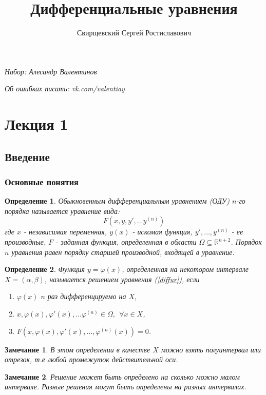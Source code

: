 \documentclass{article}
\author{Свирщевский Сергей Ростиславович}
\title{Дифференциальные уравнения}
\newtheorem*{df}{Определение}
\newtheorem*{ntc}{Замечание}
\begin{document}
  \begin{titlepage}
  \maketitle
  \begin{center}
  {\itshape\footnotesize Набор: Алесандр Валентинов}
  
  {\itshape\footnotesize Об ошибках писать: vk.com/valentiay}
  \end{center}
  \tableofcontents
  \vfill
  \end{titlepage}
  
  \section{Лекция 1}
  \subsection{Введение}
  \subsubsection{Основные понятия}
  \begin{df}
  Обыкновенным дифференциальным уравнением {(ОДУ)} $n$-го порядка называется уравнение вида:
  \begin{equation}
  \label{diffur}
  F(x, y, y', \ldots y^{(n)})
  \end{equation}
  где $x$ - независимая переменная, $y(x)$ - искомая функция, $ y', \ldots, y^{(n)} $ - ее производные, $F$ - заданная функция, определенная в области $\Omega \subseteq \mathbb{R}^{n+2}$. Порядок $n$ уравнения равен порядку старшей производной, входящей в уравнение. 
  \end{df}
  
  \begin{df}
  Функция $y = \varphi(x)$, определенная на некотором интервале $X = (\alpha, \beta)$, называется решением уравнения (\ref{diffur}), если 
  \begin{enumerate}
  \item $\varphi(x)$ $n$ раз дифференцируемо на $X$,
  \item $x, \varphi(x), \varphi'(x), \ldots \varphi^{(n)} \in \Omega,~~ \forall x \in X$,
  \item $F(x, \varphi(x), \varphi'(x), \ldots, \varphi^{(n)}(x)) = 0$.
  \end{enumerate}
  \end{df}
  \begin{ntc}
  В этом определении в качестве $X$ можно взять полуинтервал или отрезок, т.е любой промежуток действительной оси.
  \end{ntc}
  \begin{ntc}
  Решение может быть определено на сколько можно малом интервале. Разные решения могут быть определены на разных интервалах.
  \end{ntc}
  
\end{document}
